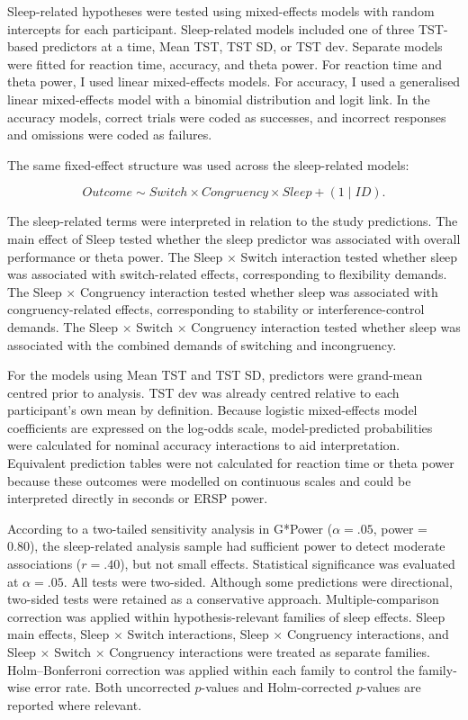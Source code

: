 \documentclass[12pt,a4paper]{report}
\begin{document}
Sleep-related hypotheses were tested using mixed-effects models with random intercepts for each participant. Sleep-related models included one of three TST-based predictors at a time, Mean TST, TST SD, or TST dev. Separate models were fitted for reaction time, accuracy, and theta power. For reaction time and theta power, I used linear mixed-effects models. For accuracy, I used a generalised linear mixed-effects model with a binomial distribution and logit link. In the accuracy models, correct trials were coded as successes, and incorrect responses and omissions were coded as failures.

The same fixed-effect structure was used across the sleep-related models:

\[
Outcome \sim Switch \times Congruency \times Sleep + (1 \mid ID).
\]

The sleep-related terms were interpreted in relation to the study predictions. The main effect of Sleep tested whether the sleep predictor was associated with overall performance or theta power. The Sleep \(\times\) Switch interaction tested whether sleep was associated with switch-related effects, corresponding to flexibility demands. The Sleep \(\times\) Congruency interaction tested whether sleep was associated with congruency-related effects, corresponding to stability or interference-control demands. The Sleep \(\times\) Switch \(\times\) Congruency interaction tested whether sleep was associated with the combined demands of switching and incongruency.

For the models using Mean TST and TST SD, predictors were grand-mean centred prior to analysis. TST dev was already centred relative to each participant's own mean by definition. Because logistic mixed-effects model coefficients are expressed on the log-odds scale, model-predicted probabilities were calculated for nominal accuracy interactions to aid interpretation. Equivalent prediction tables were not calculated for reaction time or theta power because these outcomes were modelled on continuous scales and could be interpreted directly in seconds or ERSP power.

According to a two-tailed sensitivity analysis in G*Power (\(\alpha = .05\), power = 0.80), the sleep-related analysis sample had sufficient power to detect moderate associations (\(r = .40\)), but not small effects. Statistical significance was evaluated at \(\alpha = .05\). All tests were two-sided. Although some predictions were directional, two-sided tests were retained as a conservative approach. Multiple-comparison correction was applied within hypothesis-relevant families of sleep effects. Sleep main effects, Sleep \(\times\) Switch interactions, Sleep \(\times\) Congruency interactions, and Sleep \(\times\) Switch \(\times\) Congruency interactions were treated as separate families. Holm--Bonferroni correction was applied within each family to control the family-wise error rate. Both uncorrected \(p\)-values and Holm-corrected \(p\)-values are reported where relevant.
\end{document}
